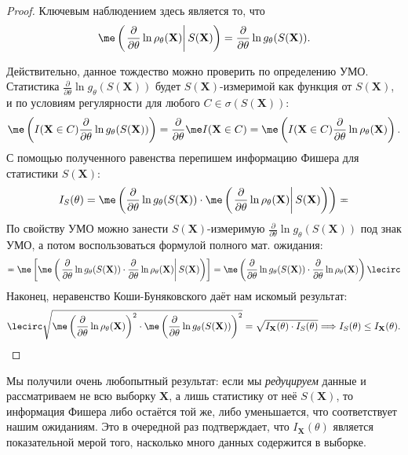 \begin{proof}
Ключевым наблюдением здесь является то, что
$$\me \left(\left.\frac{\partial}{\partial \theta}\ln{\rho_{\theta}(\mathbf X)}\right|S(\mathbf X)\right) = \frac{\partial}{\partial \theta }\ln{g_{\theta}(S(\mathbf X))}.$$

Действительно, данное тождество можно проверить по определению УМО. Статистика $\frac{\partial}{\partial \theta }\ln{g_{\theta}(S(\mathbf X))}$ будет $S(\mathbf X)$-измеримой как функция от $S(\mathbf X)$, и по условиям регулярности для любого $C \in \sigma(S(\mathbf X))$:
\[
    \me \left(I(\mathbf X \in C)\frac{\partial}{\partial \theta }\ln{g_{\theta}(S(\mathbf X))}\right) = \frac{\partial}{\partial \theta} \me I(\mathbf X \in C) = \me \left(I(\mathbf X \in C)\frac{\partial}{\partial \theta }\ln{\rho_{\theta}(\mathbf X)}\right).
\]
С помощью полученного равенства перепишем информацию Фишера для статистики $S(\mathbf X)$:
\begin{gather*}
    I_S(\theta) = \me \left(\frac{\partial}{\partial \theta }\ln{g_{\theta}(S(\mathbf X))} \cdot \me \left(\left.\frac{\partial}{\partial \theta}\ln{\rho_{\theta}(\mathbf X)}\right|S(\mathbf X)\right)\right) \eqcirc
    \end{gather*}
По свойству УМО можно занести $S(\mathbf X)$-измеримую $\frac{\partial}{\partial \theta }\ln{g_{\theta}(S(\mathbf X))}$ под знак УМО, а потом воспользоваться формулой полного мат. ожидания:
\begin{gather*}
    \eqcirc \me \left[\me \left(\left.\frac{\partial}{\partial \theta }\ln{g_{\theta}(S(\mathbf X))} \cdot \frac{\partial}{\partial \theta}\ln{\rho_{\theta}(\mathbf X)} \right|S(\mathbf X)\right)\right] = \me \left(\frac{\partial}{\partial \theta }\ln{g_{\theta}(S(\mathbf X))} \cdot \frac{\partial}{\partial \theta}\ln{\rho_{\theta}(\mathbf X)} \right) \lecirc
\end{gather*}
Наконец, неравенство Коши-Буняковского даёт нам искомый результат:
\[
    \lecirc \sqrt{\me\left( \frac{\partial}{\partial \theta}\ln{\rho_{\theta}(\mathbf X)}\right)^2\cdot \me\left(\frac{\partial}{\partial \theta }\ln{g_{\theta}(S(\mathbf X))}\right)^2} = \sqrt{I_{\mathbf X}(\theta)\cdot I_S(\theta)} \Longrightarrow I_S(\theta) \le I_{\mathbf X}(\theta).
\]
\end{proof}


Мы получили очень любопытный результат: если мы \textit{редуцируем} данные и рассматриваем не всю выборку $\mathbf X$, а лишь статистику от неё $S(\mathbf X)$, то информация Фишера либо остаётся той же, либо уменьшается, что соответствует нашим ожиданиям. Это в очередной раз подтверждает, что $I_{\mathbf X}(\theta)$ является показательной мерой того, насколько много данных содержится в выборке.

